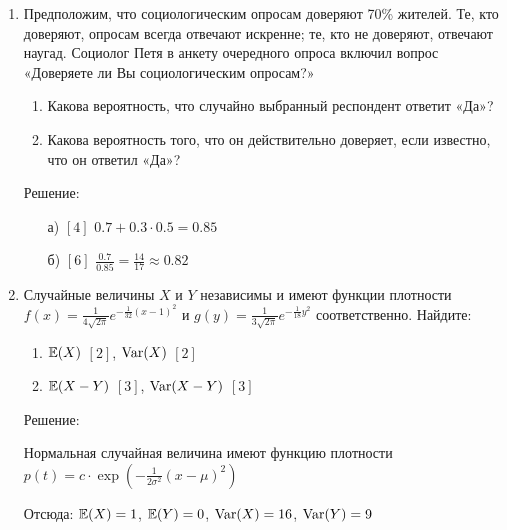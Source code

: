 \documentclass[12pt, a4paper]{article}\usepackage[]{graphicx}\usepackage[]{color}
\begin{document}
\begin{enumerate}
\item Предположим, что социологическим опросам доверяют 70\% жителей. Те, кто доверяют, опросам всегда отвечают искренне; те, кто не доверяют, отвечают наугад. Социолог Петя  в анкету очередного опроса включил вопрос «Доверяете ли Вы социологическим опросам?»
\begin{enumerate}
\item Какова вероятность, что случайно выбранный респондент ответит «Да»?
\item Какова вероятность того, что он действительно доверяет, если известно, что он ответил «Да»?
\end{enumerate}

Решение:
\begin{enumerate}
\item[а)] $[4]$ $0.7+0.3\cdot0.5=0.85$
\item[б)] $[6]$ $\frac{0.7}{0.85}=\frac{14}{17}\approx 0.82$
\end{enumerate}

\item Случайные величины $X$ и $Y$ независимы и имеют функции плотности $f(x)=\frac{1}{4\sqrt{2\pi } } e^{-\frac{1}{32} (x-1)^{2} }$ и $g(y)=\frac{1}{3\sqrt{2\pi } } e^{-\frac{1}{18} y^{2} }$ соответственно.
Найдите:
\begin{enumerate}
\item $\mathbb{E}(X)$ $[2]$, $\operatorname{Var}(X)$ $[2]$
\item $\mathbb{E}(X-Y)$ $[3]$, $\operatorname{Var}(X-Y)$ $[3]$
\end{enumerate}

Решение:

Нормальная случайная величина имеют функцию плотности $p(t)=c\cdot \exp(-\frac{1}{2\sigma^{2}}(x-\mu)^{2})$

Отсюда: $\mathbb{E}(X)=1$, $\mathbb{E}(Y)=0$, $\operatorname{Var}(X)=16$, $\operatorname{Var}(Y)=9$





\end{enumerate}
\end{document}
